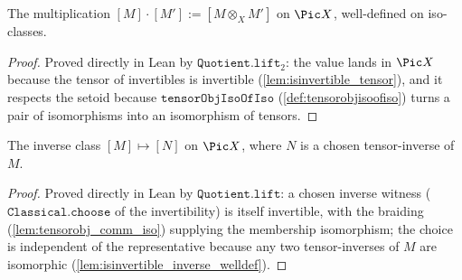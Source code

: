 \begin{definition}
  \label{def:pic_mul}
  The multiplication \([M] \cdot [M'] := [M \otimes_X M']\) on \(\Pic X\), well-defined on
  iso-classes.
\end{definition}
\begin{proof}
  \leanok
  Proved directly in Lean by \(\mathtt{Quotient.lift}_2\): the value lands in \(\Pic X\)
  because the tensor of invertibles is invertible (\cref{lem:isinvertible_tensor}), and it
  respects the setoid because \(\mathtt{tensorObjIsoOfIso}\) (\cref{def:tensorobjisoofiso})
  turns a pair of isomorphisms into an isomorphism of tensors.
\end{proof}

\begin{definition}
  \label{def:pic_inv}
  The inverse class \([M] \mapsto [N]\) on \(\Pic X\), where \(N\) is a chosen tensor-inverse
  of \(M\).
\end{definition}
\begin{proof}
  \leanok
  Proved directly in Lean by \(\mathtt{Quotient.lift}\): a chosen inverse witness
  (\(\mathtt{Classical.choose}\) of the invertibility) is itself invertible, with the
  braiding (\cref{lem:tensorobj_comm_iso}) supplying the membership isomorphism; the choice
  is independent of the representative because any two tensor-inverses of \(M\) are
  isomorphic (\cref{lem:isinvertible_inverse_welldef}).
\end{proof}
